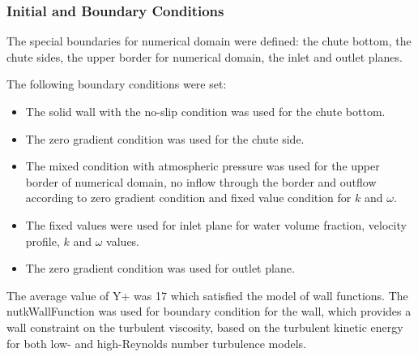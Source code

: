 \documentclass[mathematics,article,submit,pdftex,moreauthors]{Definitions/mdpi}
\begin{document}
\subsubsection{Initial and Boundary Conditions}

The special boundaries for numerical domain were defined: the chute bottom, the chute sides, the upper border for numerical domain, the inlet and outlet planes.

The following boundary conditions were set:

\begin{itemize}
    \item The solid wall with the no-slip condition was used for the chute bottom.
    \item The zero gradient condition was used for the chute side.
    \item The mixed condition with atmospheric pressure was used for the upper border of numerical domain, no inflow through the border and outflow according to zero gradient condition and fixed value condition for $k$ and $\omega$.
    \item The fixed values were used for inlet plane for water volume fraction, velocity profile, $k$ and $\omega$ values.
    \item The zero gradient condition was used for outlet plane.
\end{itemize}

The average value of Y+ was 17 which satisfied the model of wall functions. The nutkWallFunction was used for boundary condition for the wall, which provides a wall constraint on the turbulent viscosity, based on the turbulent kinetic energy for both low- and high-Reynolds number turbulence models.
\end{document}
